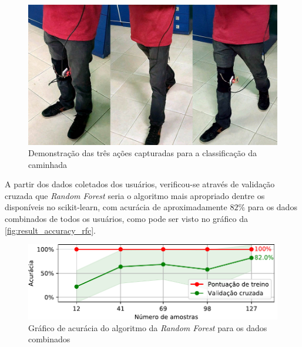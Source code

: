 \begin{figure}[ht]
	\caption{\label{fig:result_estados}Demonstração das três ações capturadas para a classificação da caminhada}
	\begin{center}
	    \includegraphics[width=\textwidth]{resources/result_estados}
	\end{center}
\end{figure}

A partir dos dados coletados dos usuários, verificou-se através de validação cruzada que \textit{Random Forest} seria o algoritmo mais apropriado dentre os disponíveis no scikit-learn, com acurácia de aproximadamente \(82\%\) para os dados combinados de todos os usuários, como pode ser visto no gráfico da \autoref{fig:result_accuracy_rfc}.


\begin{figure}[ht]
	\caption{\label{fig:result_accuracy_rfc}Gráfico de acurácia do algoritmo da \textit{Random Forest} para os dados combinados}
	\begin{center}
	    \includegraphics[width=\textwidth]{resources/result_accuracy_rfc}
	\end{center}
\end{figure}

